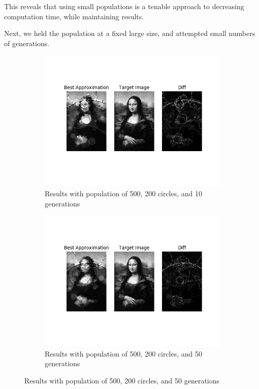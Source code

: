 \documentclass{article}
\begin{document}
This reveals that using small populations is a tenable approach to decreasing computation time, while maintaining results.

Next, we held the population at a fixed large size, and attempted small numbers of generations.

\begin{figure}[H]
    \centering
    \begin{subfigure}[b]{0.45\textwidth}
        \centering
        \includegraphics[width=\textwidth]{output/bs-p500c200g10.png}
        \caption{Results with population of 500, 200 circles, and 10 generations}
    \end{subfigure}
    \begin{subfigure}[b]{0.45\textwidth}
        \centering
        \includegraphics[width=\textwidth]{output/bs-p500c200g50.png}
        \caption{Results with population of 500, 200 circles, and 50 generations}
    \end{subfigure}
\end{figure}
\end{document}
